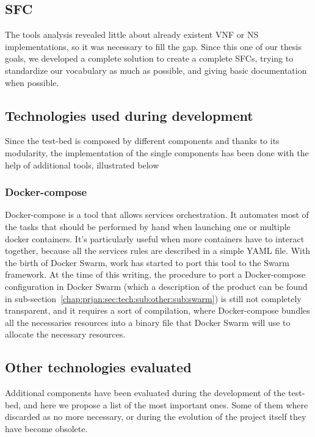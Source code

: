 \subsection{SFC}
The tools analysis revealed little about already existent VNF or NS
implementations, so it was necessary to fill the gap. Since this one of our
thesis goals, we developed a complete solution to create a complete SFCs, trying
to standardize our vocabulary as much as possible, and giving basic
documentation when possible.

\subsection{Technologies used during development}

Since the test-bed is composed by different components and thanks to its 
modularity, the implementation of the single components has been done with the 
help of additional tools, illustrated below

\subsubsection{Docker-compose} 
Docker-compose is a tool that allows services orchestration. It automates most 
of the tasks that should be performed by hand when launching one or multiple 
docker containers. It's particularly useful when more containers have to 
interact 
together, because all the services rules are described in a simple 
YAML file. With the birth of Docker Swarm, work has started to port this tool 
to 
the Swarm framework. At the time of this writing, the procedure to port a 
Docker-compose configuration in Docker Swarm (which a description of the 
product can be found in 
sub-section~\ref{chap:prjan:sec:tech:sub:other:sub:swarm}) is still not 
completely transparent, and it requires a sort of compilation, where 
Docker-compose bundles all the necessaries resources into a binary file that 
Docker Swarm will use to allocate the necessary resources.

\subsection{Other technologies evaluated}

Additional components have been evaluated during the development of the 
test-bed, and here we propose a list of the most important ones. Some of them 
where discarded as no more necessary, or during the evolution of the project 
itself they have become obsolete.

